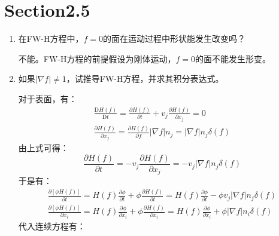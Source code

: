 \section*{Section2.5}

\begin{enumerate}
    \item 在FW-H方程中，\(f = 0\)的面在运动过程中形状能发生改变吗？
    
        不能。FW-H方程的前提假设为刚体运动，\(f = 0\)的面不能发生形变。

    \item 如果\(|\nabla f| \neq 1\)，试推导FW-H方程，并求其积分表达式。
        
        对于表面，有：
        \begin{equation}
            \begin{aligned}
                \frac{\mathrm{D} H(f)}{\mathrm{D} t}
                =\frac{\partial H(f)}{\partial t}+v_{j} \frac{\partial H(f)}{\partial x_{j}}
                =0 \\
                \frac{\partial H(f)}{\partial x_{j}}
                =\frac{\partial H(f)}{\partial f} |\nabla f| n_{j}
                =|\nabla f| n_{j} \delta(f)
            \end{aligned}
        \end{equation}
        由上式可得：
        \begin{equation}
            \frac{\partial H(f)}{\partial t}
            =-v_{j} \frac{\partial H(f)}{\partial x_{j}}
            =-v_{j} |\nabla f| n_{j} \delta(f)
        \end{equation}
        于是有：
        \begin{equation}
            \begin{aligned}
                \frac{\partial[\phi H(f)]}{\partial t}
                =H(f) \frac{\partial \phi}{\partial t}+\phi \frac{\partial H(f)}{\partial t}
                =H(f) \frac{\partial \phi}{\partial t}-\phi v_{j} |\nabla f| n_{j} \delta(f) \\
                \frac{\partial[\phi H(f)]}{\partial x_{i}}
                =H(f) \frac{\partial \phi}{\partial x_{i}}+\phi \frac{\partial H(f)}{\partial x_{i}}
                =H(f) \frac{\partial \phi}{\partial x_{i}}+\phi |\nabla f| n_{i} \delta(f)
            \end{aligned}
        \end{equation}
        代入连续方程有：
        \begin{equation}
            \begin{aligned}

\end{aligned}
\end{equation}
\end{enumerate}
